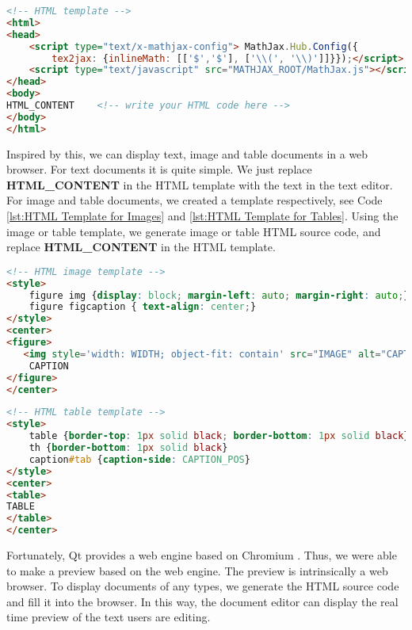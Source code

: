 \begin{lstlisting}[language=HTML, caption={HTML Template for MathJax Render\label{lst:HTML Template for MathJax Render}}]
<!-- HTML template -->
<html>
<head>
    <script type="text/x-mathjax-config"> MathJax.Hub.Config({
        tex2jax: {inlineMath: [['$','$'], ['\\(', '\\)']]}});</script>
    <script type="text/javascript" src="MATHJAX_ROOT/MathJax.js"></script>
</head>
<body>
HTML_CONTENT    <!-- write your HTML code here -->
</body>
</html>
\end{lstlisting}

Inspired by this, we can display text, image and table documents in a web browser. For text documents it is quite simple. We just replace \textbf{HTML\_CONTENT} in the HTML template with the text in the text editor. For image and table documents, we created a template respectively, see Code \ref{lst:HTML Template for Images} and \ref{lst:HTML Template for Tables}. Using the image or table template, we generate image or table HTML source code, and replace \textbf{HTML\_CONTENT} in the HTML template.

\begin{lstlisting}[language=html, caption={HTML Template for Images\label{lst:HTML Template for Images}}]
<!-- HTML image template -->
<style>
    figure img {display: block; margin-left: auto; margin-right: auto;}
    figure figcaption { text-align: center;}
</style>
<center>
<figure>
   <img style='width: WIDTH; object-fit: contain' src="IMAGE" alt="CAPTION"/>
    CAPTION
</figure>
</center>
\end{lstlisting}

\begin{lstlisting}[language=html, caption={HTML Template for Tables\label{lst:HTML Template for Tables}}]
<!-- HTML table template -->
<style>
    table {border-top: 1px solid black; border-bottom: 1px solid black}
    th {border-bottom: 1px solid black}
    caption#tab {caption-side: CAPTION_POS}
</style>
<center>
<table>
TABLE
</table>
</center>
\end{lstlisting}

Fortunately, Qt provides a web engine \cite{qtwebengine} based on Chromium \cite{chromium}. Thus, we were able to make a preview based on the web engine. The preview is intrinsically a web browser. To display documents of any types, we generate the HTML source code and fill it into the browser. In this way, the document editor can display the real time preview of the text users are editing.

